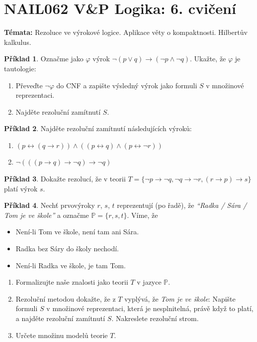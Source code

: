 \documentclass[a4paper]{article}
\theoremstyle{plain}
\theoremstyle{definition}
\newtheorem{problem}{Příklad}
\begin{document}
\section*{NAIL062 V\&P Logika: 6. cvičení}


\textbf{Témata:} 
Rezoluce ve výrokové logice. Aplikace věty o kompaktnosti. Hilbertův kalkulus.


\medskip\begin{problem}
Označme jako $\varphi$ výrok $\neg (p \vee q) \to (\neg p \wedge \neg q)$. Ukažte, že $\varphi$ je tautologie:
\begin{enumerate}
    \item Převeďte $\neg \varphi$ do CNF a zapište výsledný výrok jako formuli $S$ v množinové reprezentaci.
    \item Najděte rezoluční zamítnutí $S$.
\end{enumerate}
\end{problem}


\medskip\begin{problem}
Najděte rezoluční zamítnutí následujících výroků:
\begin{enumerate}
    \item $(p\leftrightarrow (q\to r))\wedge((p\leftrightarrow q)\wedge(p\leftrightarrow \neg r))$
    \item $\neg(((p\to q)\to \neg q)\to \neg q)$
\end{enumerate}
\end{problem}
    
    
\medskip\begin{problem}
Dokažte rezolucí, že v teorii $T=\{\neg p \to \neg q,\neg q \to \neg r, (r\to p)\to s\}$ platí výrok $s$.
\end{problem}


\medskip\begin{problem}Nechť prvovýroky $r$, $s$, $t$  reprezentují (po řadě), že \emph{``Radka / Sára / Tom je ve škole''} a označme $\mathbb{P}=\{r,s,t\}$. Víme, že
    \begin{itemize}\it
    \item Není-li Tom ve škole, není tam ani Sára.
    \item Radka bez Sáry do školy nechodí.
    \item Není-li Radka ve škole, je tam Tom.
    \end{itemize}
    \begin{enumerate}
    \item Formalizujte naše znalosti jako teorii $T$ v jazyce $\mathbb P$.
    \item Rezoluční metodou dokažte, že z $T$ vyplývá, že \emph{Tom je ve škole}: Napište formuli $S$ v množinové reprezentaci, která je nesplnitelná, právě když to platí, a najděte rezoluční zamítnutí $S$. Nakreslete rezoluční strom.
    \item Určete množinu modelů teorie $T$.
    \end{enumerate}
\end{problem}
\end{document}
